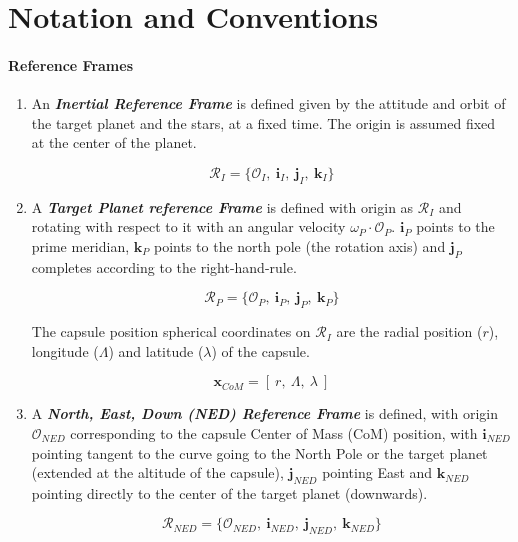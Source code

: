\newpage
\chapter{Notation and Conventions}

\subsubsection{Reference Frames}

   \begin{enumerate}
      \item An \textbf{\textit{Inertial Reference Frame}} is defined given by the attitude and orbit of the target planet
         and the stars, at a fixed time.
         The origin is assumed fixed at the center of the planet.

         $$\mathcal{R}_{I}=\{ \mathcal{O}_{I},\: \textbf{i}_{I},\:\textbf{j}_I,\: \textbf{k}_I \}$$

      \item A \textbf{\textit{Target Planet reference Frame}} is defined with 
         origin as $\mathcal{R}_{I}$ and rotating with respect to it with an angular
         velocity $\omega_{P}\cdot \mathcal{O}_{P}$.
         $\textbf{i}_{P}$ points to the prime meridian, $\textbf{k}_{P}$ points to the
         north pole (the rotation axis) and $\textbf{j}_{P}$ completes according
         to the right-hand-rule.

         $$\mathcal{R}_{P}=\{ \mathcal{O}_{P},\: \textbf{i}_{P},\:\textbf{j}_P,\: \textbf{k}_P \}$$

         The capsule position spherical coordinates on $\mathcal{R}_{I}$ are the radial position
         ($r$), longitude ($\Lambda$) and latitude ($\lambda$) of the capsule.
      
         $$
            \textbf{x}_{CoM} = [\: r,\:\Lambda,\:\lambda \:]
         $$

      \item A \textbf{\textit{North, East, Down (NED) Reference Frame}} is defined, with origin $\mathcal{O}_{NED}$
         corresponding to the capsule Center of Mass (CoM) position, with $\textbf{i}_{NED}$
         pointing tangent to the curve going to the North Pole or the target planet (extended at
         the altitude of the capsule), $\textbf{j}_{NED}$ pointing East and $\textbf{k}_{NED}$
         pointing directly to the center of the target planet (downwards).

         $$\mathcal{R}_{NED}=\{ \mathcal{O}_{NED},\: \textbf{i}_{NED},\:\textbf{j}_{NED},\: \textbf{k}_{NED} \}$$


\end{enumerate}
